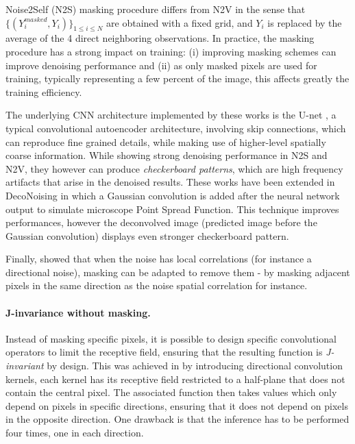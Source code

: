 \documentclass{article}
\begin{document}
Noise2Self (N2S) \cite{batson2019noise2self} masking procedure differs from N2V in the sense that $\{(Y^{masked}_i,Y_i)\}_{1\leqslant i\leqslant N}$ are obtained with a fixed grid, and $Y_i$ is replaced by the average of the 4 direct neighboring observations.
In practice, the masking procedure has a strong impact on training: (i) improving masking schemes can improve denoising performance and (ii) as only masked pixels are used for training, typically representing a few percent of the image, this affects greatly the training efficiency.

The underlying CNN architecture implemented by these works is the U-net \cite{ronneberger2015u}, a typical convolutional autoencoder architecture, involving skip connections, which can reproduce fine grained details, while making use of higher-level spatially coarse information. While showing strong denoising performance in N2S and N2V, they however can produce \textit{checkerboard patterns}, which are high frequency artifacts that arise in the denoised results.
These works have been extended in DecoNoising \cite{goncharova2020} in which a Gaussian convolution is added after the neural network output to simulate microscope Point Spread Function.
This technique improves performances, however the deconvolved image (predicted image before the Gaussian convolution) displays even stronger checkerboard pattern.

Finally, \cite{broaddus2020removing} showed that when the noise has local correlations (for instance a  directional noise),  masking can be adapted to remove them - by masking adjacent pixels in the same direction as the noise spatial correlation for instance.

\paragraph{J-invariance without masking.}
Instead of masking specific pixels, it is possible to design specific convolutional operators to limit the receptive field, ensuring that the resulting function is \textit{J-invariant} by design. This was achieved in \cite{laine2019high} by introducing directional convolution kernels, each kernel has its receptive field restricted to a half-plane that does not contain the central pixel. The associated function then takes values which only depend on pixels in specific directions, ensuring that it does not depend on pixels in the opposite direction. One drawback is that the inference has to be performed four times, one in each direction.
\end{document}
